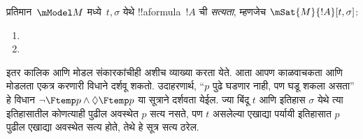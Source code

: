 \documentclass[../../../include/open-logic-section]{subfiles}
\begin{document}
\begin{defn}
  प्रतिमान~$\mModel M$ मध्ये~$t, \sigma$ येथे
  !!a{formula}~$!A$ ची \emph{सत्यता}, म्हणजेच
  $\mSat{M}{!A}[t, \sigma]$:
  \begin{enumerate}
  \item{} 
  \item{} 
  \end{enumerate}
\end{defn}

इतर कालिक आणि मोडल संकारकांचीही अशीच व्याख्या
करता येते. आता आपण काळवाचकता आणि मोडलता
एकत्र करणारी विधाने दर्शवू शकतो. उदाहरणार्थ,
``$p$ पुढे घडणार नाही, पण घडू शकला असता'' हे
विधान $\lnot \Ftemp p \land \Diamond \Ftemp p$
या सूत्राने दर्शवता येईल. ज्या बिंदू $t$ आणि इतिहास $\sigma$ येथे
त्या इतिहासातील कोणत्याही पुढील अवस्थेत $p$ सत्य नसते,
पण $t$ असलेल्या एखाद्या पर्यायी इतिहासात $p$ पुढील
एखाद्या अवस्थेत सत्य होते, तेथे हे सूत्र सत्य ठरेल.
\end{document}
